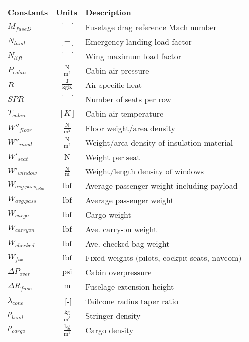 % 

{\footnotesize
\begin{supertabular}{lcl}
\toprule
Constants & Units & Description \\ \midrule
$M_{fuseD}$ & $~[-]$ & Fuselage drag reference Mach number \\
$N_{land}$ &  $~[-]$  & Emergency landing load factor \\
$N_{lift}$ &  $~[-]$  & Wing maximum load factor \\
$P_{cabin}$ & $~\mathrm{\tfrac{N}{m^{2}}}$ & Cabin air pressure \\
$R$ & $~\mathrm{\tfrac{J}{kgK}}$ & Air specific heat \\
$SPR$ & $~[-]$ & Number of seats per row \\
$T_{cabin}$ & $~[K]$ & Cabin air temperature \\
$W''_{floor}$ & $~\mathrm{\tfrac{N}{m^{2}}}$ & Floor weight/area density \\
$W''_{insul}$ & $~\mathrm{\tfrac{N}{m^{2}}}$ & Weight/area density of insulation material \\
$W'_{seat}$ & $~\mathrm{N}$ & Weight per seat \\
$W'_{window}$ & $~\mathrm{\tfrac{N}{m}}$ & Weight/length density of windows \\
$W_{avg. pass_{total}}$ & $~\mathrm{lbf}$ & Average passenger weight including payload \\
$W_{avg. pass}$ & $~\mathrm{lbf}$ & Average passenger weight \\
$W_{cargo}$ & $~\mathrm{lbf}$ & Cargo weight \\
$W_{carry on}$ & $~\mathrm{lbf}$ & Ave. carry-on weight \\
$W_{checked}$ & $~\mathrm{lbf}$ & Ave. checked bag weight \\
$W_{fix}$ & $~\mathrm{lbf}$ & Fixed weights (pilots, cockpit seats, navcom) \\
$\Delta P_{over}$ & $~\mathrm{psi}$ & Cabin overpressure \\
$\Delta R_{fuse}$ & $~\mathrm{m}$ & Fuselage extension height \\
$\lambda_{cone}$ & $ $~[-]$ $ & Tailcone radius taper ratio \\
$\rho_{bend}$ & $~\mathrm{\tfrac{kg}{m^{3}}}$ & Stringer density \\
$\rho_{cargo}$ & $~\mathrm{\tfrac{kg}{m^{3}}}$ & Cargo density \\

\end{supertabular}}
